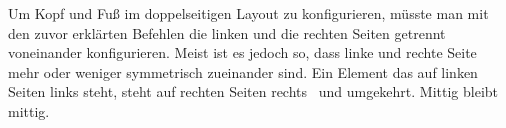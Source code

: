 %
\EndIndexGroup


\begin{Declaration}
\end{Declaration}
Um Kopf und Fuß im doppelseitigen Layout zu konfigurieren, müsste man mit den
zuvor erklärten Befehlen die linken und die rechten Seiten getrennt
voneinander konfigurieren. Meist ist es jedoch so, dass linke und rechte Seite
mehr oder weniger symmetrisch zueinander sind. Ein Element das auf linken
Seiten links steht, steht auf rechten Seiten rechts%
\iffalse%
. Ein Element, das auf linken Seiten rechts steht, steht auf rechten Seiten
links.
Mittig angeordnete Elemente sind normalerweise auf beiden Seiten mittig
angeordnet.%
\else%
\ und umgekehrt. Mittig bleibt mittig.%
\fi%

